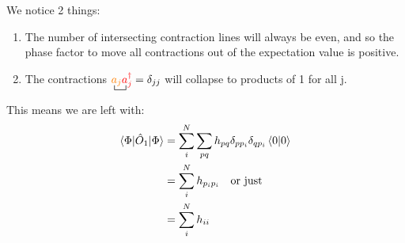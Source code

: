 \documentclass{article}
\newcommand{\ctr}{\bcontraction}
\newcommand{\dg}{\ensuremath{^\dagger} }
\begin{document}
We notice 2 things: 
\begin{enumerate}
\item The number of intersecting contraction lines will always be even, and so the phase factor to move all contractions out of the expectation value is positive.
\item The contractions $\ctr{}{a}{{}_p}{a} {\color{orange} a_{j}}{\color{red} a_j\dg }=  \delta_{jj}$ will collapse to products of 1 for all j. 
\end{enumerate}
This means we are left with: 
\begin{align*}
\braket{\Phi | \hat{O}_1 | \Phi} &= \sum_i^N  \sum_{pq}   h_{pq} \delta_{p p_i}   \delta_{q p_i}  \braket{0| 0} \\
&= \sum_i^N h_{p_i p_i}  \quad \text{or just }\\
&= \sum_i^N h_{i i} 
\end{align*}
\end{document}
